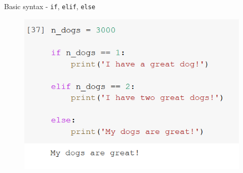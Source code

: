 \documentclass[aspectratio=169]{beamer}
\begin{document}
\begin{frame}{Basic syntax - \texttt{if}, \texttt{elif}, \texttt{else}}
\begin{multicols}{3}
\begin{figure}
			\includegraphics[width=\linewidth]{img/else.png}
		\end{figure}

	\end{multicols}

\end{frame}
\end{document}
